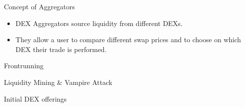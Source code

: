 \documentclass[]{beamer}
\begin{document}
\begin{frame}{Concept of Aggregators}
\begin{figure}
	\centering
	\resizebox{0.8\textwidth}{!}{
	\begin{tikzpicture}[scale=1.0, every node/.style={scale=1.0}]
			
	\end{tikzpicture}}
\end{figure}
	
\begin{itemize}
	\item DEX Aggregators source liquidity from different DEXs.
	\item They allow a user to compare different swap prices and to choose on which DEX their trade is performed.
\end{itemize}

\end{frame}


\begin{frame}{Frontrunning}
\end{frame}


\begin{frame}{Liquidity Mining \& Vampire Attack}
	\begin{figure}[h!]
		\begin{center}
			
		\end{center}
	\end{figure}
\end{frame}


\begin{frame}{Initial DEX offerings}

\end{frame}
\end{document}
